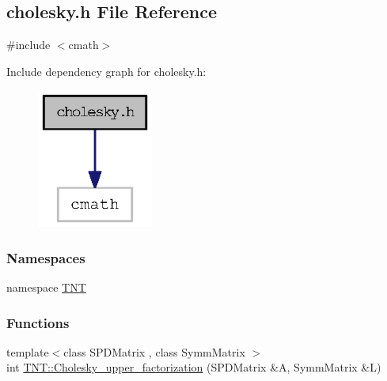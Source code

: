 \subsection{cholesky.h File Reference}
\label{cholesky_8h}
{\ttfamily \#include $<$cmath$>$}\par
Include dependency graph for cholesky.h:
\nopagebreak
\begin{figure}[H]
\begin{center}
\leavevmode
\includegraphics[width=108pt]{cholesky_8h__incl}
\end{center}
\end{figure}
\subsubsection*{Namespaces}
\begin{DoxyCompactItemize}
\item 
namespace \hyperlink{namespace_t_n_t}{TNT}
\end{DoxyCompactItemize}
\subsubsection*{Functions}
\begin{DoxyCompactItemize}
\item 
{\footnotesize template$<$class SPDMatrix , class SymmMatrix $>$ }\\int \hyperlink{namespace_t_n_t_a01238ecda241d07a17451de581788862}{TNT::Cholesky\_\-upper\_\-factorization} (SPDMatrix \&A, SymmMatrix \&L)
\end{DoxyCompactItemize}
